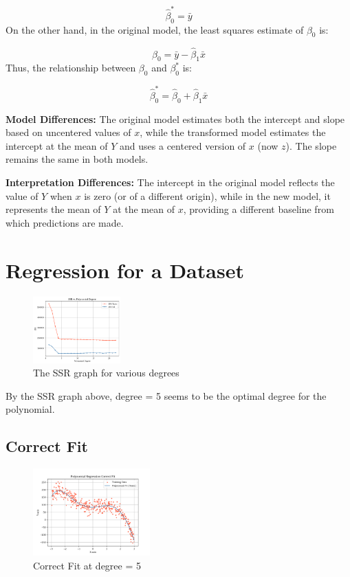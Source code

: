 \begin{equation*}
\hat{\beta}_0^* = \bar{y}
\end{equation*}
On the other hand, in the original model, the least squares estimate of $\beta_0$
is:

\begin{equation*}
\hat{\beta}_0 = \bar{y} - \hat{\beta}_1 \bar{x}
\end{equation*}
Thus, the relationship between $\beta_0$ and $\beta_0^*$ is:

\begin{equation*}
\hat{\beta}_0^* = \hat{\beta}_0 + \hat{\beta}_1 \bar{x}
\end{equation*}

\noindent \textbf{Model Differences:}
The original model estimates both the intercept and slope based on uncentered
values of $x$, while the transformed model estimates the intercept at the mean of
$Y$ and uses a centered version of $x$ (now $z$). The slope remains the same in
both models.

\noindent \textbf{Interpretation Differences:}
The intercept in the original model reflects the value of $Y$ when $x$ is zero
(or of a different origin), while in the new model, it represents the mean of
$Y$ at the mean of $x$, providing a different baseline from which predictions are
made.

\section{Regression for a Dataset}

\begin{figure}[H]
  \centering
  \includegraphics[width=0.3\textwidth]{assets/images/SSR-graph.png}
  \caption{The SSR graph for various degrees}
\end{figure}

By the SSR graph above, degree = 5 seems to be the optimal degree for the
polynomial.

\subsection{Correct Fit}
\begin{figure}[H]
  \centering
  \includegraphics[width=0.4\textwidth]{assets/images/3_correctfit.png}
  \caption{Correct Fit at degree = 5}
\end{figure}

